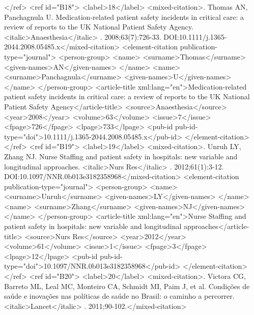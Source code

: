       </ref>
      <ref id="B18">
        <label>18</label>
        <mixed-citation>. Thomas AN, Panchagnula U. Medication-related patient safety incidents in
          critical care: a review of reports to the UK National Patient Safety Agency.
            <italic>Anaesthesia</italic> . 2008;63(7):726-33.
          DOI:10.1111/j.1365-2044.2008.05485.x</mixed-citation>
        <element-citation publication-type="journal">
          <person-group>
            <name>
              <surname>Thomas</surname>
              <given-names>AN</given-names>
            </name>
            <name>
              <surname>Panchagnula</surname>
              <given-names>U</given-names>
            </name>
          </person-group>
          <article-title xml:lang="en">Medication-related patient safety incidents in critical care:
            a review of reports to the UK National Patient Safety Agency</article-title>
          <source>Anaesthesia</source>
          <year>2008</year>
          <volume>63</volume>
          <issue>7</issue>
          <fpage>726</fpage>
          <lpage>733</lpage>
          <pub-id pub-id-type="doi">10.1111/j.1365-2044.2008.05485.x</pub-id>
        </element-citation>
      </ref>
      <ref id="B19">
        <label>19</label>
        <mixed-citation>. Unruh LY, Zhang NJ. Nurse Staffing and patient safety in hospitals: new
          variable and longitudinal approaches. <italic>Nurs Res</italic> . 2012;61(1):3-12.
          DOI:10.1097/NNR.0b013e3182358968</mixed-citation>
        <element-citation publication-type="journal">
          <person-group>
            <name>
              <surname>Unruh</surname>
              <given-names>LY</given-names>
            </name>
            <name>
              <surname>Zhang</surname>
              <given-names>NJ</given-names>
            </name>
          </person-group>
          <article-title xml:lang="en">Nurse Staffing and patient safety in hospitals: new variable
            and longitudinal approaches</article-title>
          <source>Nurs Res</source>
          <year>2012</year>
          <volume>61</volume>
          <issue>1</issue>
          <fpage>3</fpage>
          <lpage>12</lpage>
          <pub-id pub-id-type="doi">10.1097/NNR.0b013e3182358968</pub-id>
        </element-citation>
      </ref>
      <ref id="B20">
        <label>20</label>
        <mixed-citation>. Victora CG, Barreto ML, Leal MC, Monteiro CA, Schmidt MI, Paim J, et al.
          Condições de saúde e inovações nas políticas de saúde no Brasil: o caminho a percorrer.
            <italic>Lancet</italic> . 2011;90-102.</mixed-citation>
